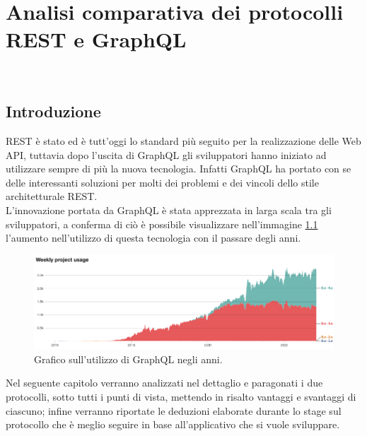 
\chapter{Analisi comparativa dei protocolli REST e GraphQL}
\label{cap:analisi-comparativa}
\\
\section{Introduzione}
REST è stato ed è tutt'oggi lo standard più seguito per la realizzazione delle Web API, tuttavia dopo l'uscita di GraphQL gli sviluppatori hanno iniziato ad utilizzare sempre di più la nuova tecnologia. Infatti GraphQL ha portato con se delle interessanti soluzioni per molti dei problemi e dei vincoli dello stile architetturale REST.\\
L'innovazione portata da GraphQL è stata apprezzata in larga scala tra gli sviluppatori, a conferma di ciò è possibile visualizzare nell'immagine \ref{graphQL-usage-chart} l'aumento nell'utilizzo di questa tecnologia con il passare degli anni.
\FloatBarrier
\begin{figure}[!ht]
\centering
\includegraphics[width=1\linewidth]{immagini/GraphQLUsageChart.png}
\caption{Grafico sull'utilizzo di GraphQL negli anni.}
\label{graphQL-usage-chart}
\end{figure}
\FloatBarrier
Nel seguente capitolo verranno analizzati nel dettaglio e paragonati i due protocolli, sotto tutti i punti di vista, mettendo in risalto vantaggi e svantaggi di ciascuno; infine verranno riportate le deduzioni elaborate durante lo stage sul protocollo che è meglio seguire in base all'applicativo che si vuole sviluppare.
